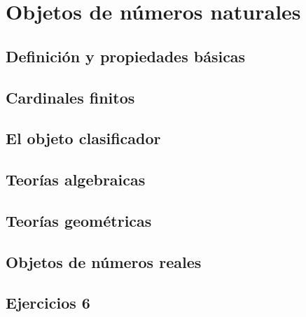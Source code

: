 \chapter{Objetos de números naturales}
\label{cap:6}

\section{Definición y propiedades básicas}
\label{sec:6.1}

\section{Cardinales finitos}
\label{sec:6.2}

\section{El objeto clasificador}
\label{sec:6.3}

\section{Teorías algebraicas}
\label{sec:6.4}

\section{Teorías geométricas}
\label{sec:6.5}

\section{Objetos de números reales}
\label{sec:6.6}

\section*{Ejercicios 6}
\label{sec:ejercicios-6}
